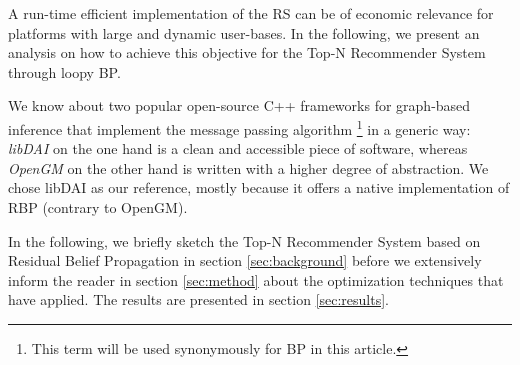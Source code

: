 A run-time efficient implementation of the RS can be of economic relevance for platforms with large and dynamic user-bases. In the following, we present an analysis on how to achieve this objective for the Top-N Recommender System through loopy BP.

We know about two popular open-source C++ frameworks for graph-based inference that implement the message passing algorithm \footnote{This term will be used synonymously for BP in this article.} in a generic way: \textit{libDAI} \cite{Mooij_libDAI_10} on the one hand is a clean and accessible piece of software, whereas \textit{OpenGM} \cite{andres2012opengm} on the other hand is written with a higher degree of abstraction. We chose libDAI as our reference, mostly because it offers a native implementation of RBP (contrary to OpenGM).

In the following, we briefly sketch the Top-N Recommender System based on Residual Belief Propagation in section \ref{sec:background} before we extensively inform the reader in section \ref{sec:method} about the optimization techniques that have applied. The results are presented in section \ref{sec:results}.